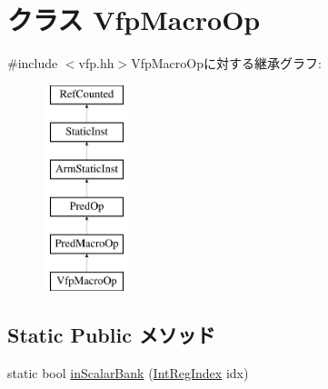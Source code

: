 \hypertarget{classArmISA_1_1VfpMacroOp}{
\section{クラス VfpMacroOp}
\label{classArmISA_1_1VfpMacroOp}
}


{\ttfamily \#include $<$vfp.hh$>$}VfpMacroOpに対する継承グラフ:\begin{figure}[H]
\begin{center}
\leavevmode
\includegraphics[height=6cm]{classArmISA_1_1VfpMacroOp}
\end{center}
\end{figure}
\subsection*{Static Public メソッド}
\begin{DoxyCompactItemize}
\item 
static bool \hyperlink{classArmISA_1_1VfpMacroOp_a0cbd00c4ea56d646aae899c4d0a60a38}{inScalarBank} (\hyperlink{namespaceArmISA_ae64680ba9fb526106829d6bf92fc791b}{IntRegIndex} idx)
\end{DoxyCompactItemize}
